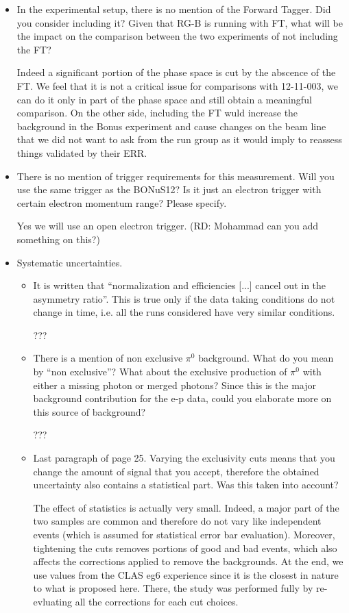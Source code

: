 \begin{itemize}
 \item In the experimental setup, there is no mention of the Forward Tagger. Did you consider including it? Given that RG-B is running with FT, what will be the impact on the comparison between the two experiments of not including the FT?
 
{\color{red} Indeed a significant portion of the phase space is cut by the abscence of the FT. We feel that it is not a 
critical issue for comparisons with 12-11-003, we can do it only in part of the phase space and still obtain
a meaningful comparison. On the other side, including the FT wuld increase the background in the Bonus 
experiment and cause changes on the beam line that we did not want to ask from the run group as it would imply 
to reassess things validated by their ERR.}

  \item There is no mention of trigger requirements for this measurement. Will you use the same trigger as the BONuS12? Is it just an electron trigger with certain electron momentum range? Please specify.
  
{\color{red} Yes we will use an open electron trigger. (RD: Mohammad can you add something on this?)}

  \item Systematic uncertainties. 
  \begin{itemize}
   \item  It is written that ``normalization and efficiencies [...] cancel out in the asymmetry ratio''. This is true only if the data taking conditions do not change in time, i.e. all the runs considered have very similar conditions.

{\color{red} ???}

   \item There is a mention of non exclusive $\pi^0$ background. What do you mean by ``non exclusive''? What about the exclusive production of $\pi^0$ with either a missing photon or merged photons? Since this is the major background contribution for the e-p data, could you elaborate more on this source of background?

{\color{red} ???}

   \item Last paragraph of page 25. Varying the exclusivity cuts means that you change the amount of signal that you accept, therefore the obtained uncertainty also contains a statistical part. Was this taken into account?

{\color{red} The effect of statistics is actually very small. Indeed, a major part of the two samples are common and 
therefore do not vary like independent events (which is assumed for statistical error bar evaluation). 
Moreover, tightening the cuts removes portions of good and bad events, which 
also affects the corrections applied to remove the backgrounds. At the end, we use values from the CLAS eg6
experience since it is the closest in nature to what is proposed here. There, the study was performed fully
by re-evluating all the corrections for each cut choices.}


\end{itemize}
\end{itemize}
